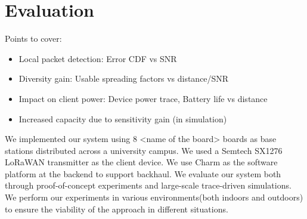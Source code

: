\section{Evaluation}
\label{sec:eval}

{\color{blue} Points to cover:

\begin{itemize}
    \item Local packet detection: Error CDF vs SNR
    \item Diversity gain: Usable spreading factors vs distance/SNR
    \item Impact on client power: Device power trace, Battery life vs distance
    \item Increased capacity due to sensitivity gain (in simulation)
\end{itemize}
}

We implemented our system using 8 <name of the board> boards as base stations
distributed across a university campus.  We used a Semtech SX1276 LoRaWAN
transmitter as the client device. We use Charm as the software platform at the
backend to support backhaul. We evaluate our system both through
proof-of-concept experiments and large-scale trace-driven simulations. We
perform our experiments in various environments(both indoors and outdoors) to
ensure the viability of the approach in different situations.